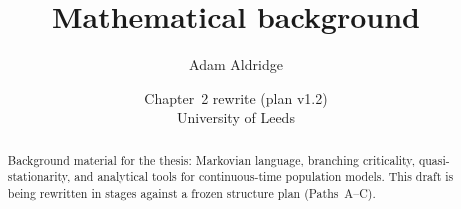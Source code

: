 \documentclass[11pt]{article}
\title{Mathematical background}
\author{Adam Aldridge}
\date{Chapter~2 rewrite (plan v1.2)\\University of Leeds}
\theoremstyle{plain}
\theoremstyle{definition}
\theoremstyle{remark}
\begin{document}
\maketitle
\vspace{-1.5em}

\begin{abstract}
\noindent
Background material for the thesis: Markovian language, branching criticality, quasi-stationarity, and analytical tools for continuous-time population models. This draft is being rewritten in stages against a frozen structure plan (Paths~A--C).
\end{abstract}

\tableofcontents
\clearpage












\appendix




\FloatBarrier
\begingroup
\footnotesize


\endgroup
\end{document}
